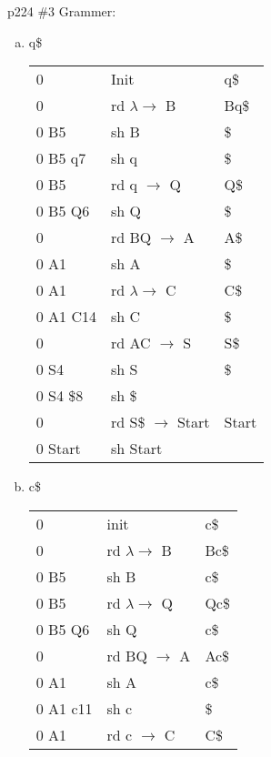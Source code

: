 \documentclass[11pt]{article}
\begin{document}
    p224 \#3
    Grammer:
    \begin{enumerate}[(a)]
        \item q\$ \\
            \begin{tabular}{|l|l|l|}
                0       & Init          & q\$ \\
                0       & rd $\lambda \to$ B  & Bq\$  \\
                0 B5    & sh B          & \$ \\
                0 B5 q7 & sh q          & \$ \\
                0 B5    & rd q $\to$ Q    & Q\$ \\
                0 B5 Q6 & sh Q          & \$ \\
                0       & rd BQ $\to$ A & A\$ \\
                0 A1    & sh A          & \$ \\
                0 A1    & rd $\lambda \to$ C & C\$ \\
                0 A1 C14& sh C          & \$ \\
                0       & rd AC $\to$ S & S\$ \\
                0 S4    & sh S          & \$ \\
                0 S4 \$8& sh \$         & \\
                0       & rd S\$ $\to$ Start & Start \\
                0 Start & sh Start      &
            \end{tabular}
        \item c\$ \\
            \begin{tabular}{|l|l|l|}
                0       & init          & c\$ \\
                0       & rd $\lambda \to$ B & Bc\$ \\
                0 B5    & sh B          & c\$ \\
                0 B5    & rd $\lambda \to$ Q & Qc\$ \\
                0 B5 Q6 & sh Q          & c\$ \\
                0       & rd BQ $\to$ A & Ac\$ \\
                0 A1    & sh A          & c\$ \\
                0 A1 c11& sh c          & \$ \\
                0 A1    & rd c $\to$ C  & C\$ \\

\end{tabular}
\end{enumerate}
\end{document}
